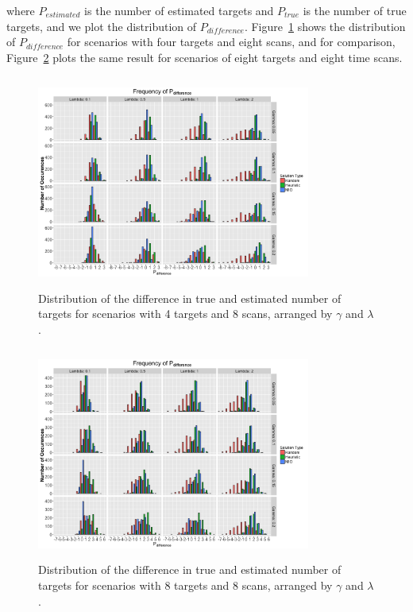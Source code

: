\documentclass[journal]{IEEEtran}
\begin{document}
where $P_{estimated}$ is the number of estimated targets and $P_{true}$ is the number of true targets, and we plot the distribution of $P_{difference}$. Figure~\ref{fig:Robust_4_8_Histogram} shows the distribution of $P_{difference}$ for scenarios with four targets and eight scans, and for comparison, Figure~\ref{fig:Robust_8_8_Histogram} plots the same result for scenarios of eight targets and eight time scans. 
\begin{figure}[h]
  \centering
  \includegraphics[width=9cm, height=7cm]{4_8_Histogram}
  \caption{Distribution of the difference in true and estimated number of targets for scenarios with 4 targets and 8 scans, arranged by $\gamma$ and $\lambda$.}
  \label{fig:Robust_4_8_Histogram}
\end{figure}

\begin{figure}[h]
  \centering
  \includegraphics[width=9cm, height=7cm]{8_8_Histogram}
  \caption{Distribution of the difference in true and estimated number of targets for scenarios with 8 targets and 8 scans, arranged by $\gamma$ and $\lambda$.}
  \label{fig:Robust_8_8_Histogram}
\end{figure}
\end{document}
